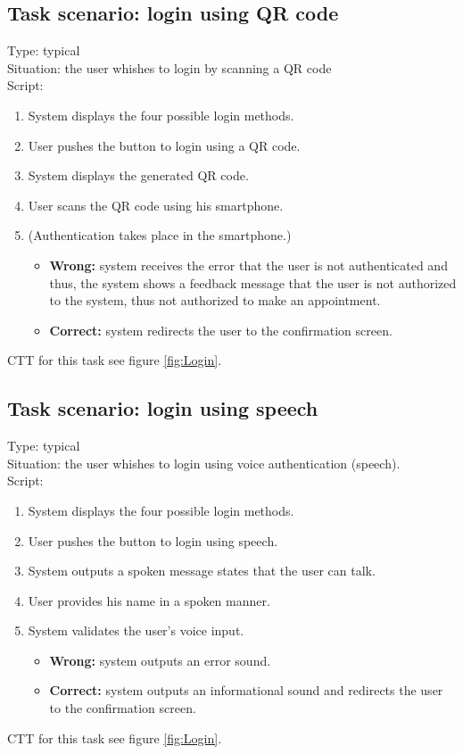 \documentclass[11pt, a4paper,svglistings]{report}
\begin{document}
\subsection{\label{subsec:loginNFC}Task scenario: login using QR code}

Type: typical \\
Situation: the user whishes to login by scanning a QR code \\
Script:
\begin{enumerate}
\item System displays the four possible login methods.
\item User pushes the button to login using a QR code.
\item System displays the generated QR code.
\item User scans the QR code using his smartphone.
\item (Authentication takes place in the smartphone.)
\begin{itemize}
\item \textbf{Wrong:} system receives the error that the user is not authenticated and thus, the system shows a feedback message that the user is not authorized to the system, thus not authorized to make an appointment.
\item \textbf{Correct:} system redirects the user to the confirmation screen.
\end{itemize}
\end{enumerate}
CTT for this task see figure \ref{fig:Login}.

\subsection{\label{subsec:loginSpeech}Task scenario: login using speech}

Type: typical \\
Situation: the user whishes to login using voice authentication (speech). \\
Script:
\begin{enumerate}
\item System displays the four possible login methods.
\item User pushes the button to login using speech.
\item System outputs a spoken message states that the user can talk.
\item User provides his name in a spoken manner.
\item System validates the user's voice input.
\begin{itemize}
\item \textbf{Wrong:} system outputs an error sound.
\item \textbf{Correct:} system outputs an informational sound and redirects the user to the  confirmation screen.
\end{itemize}
\end{enumerate}
CTT for this task see figure \ref{fig:Login}.
\end{document}
